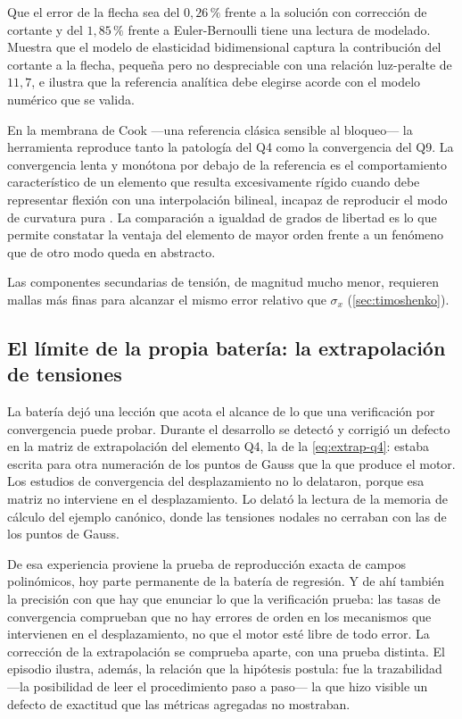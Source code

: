 Que el error de la flecha sea del $0{,}26\,\%$ frente a la solución con corrección de cortante y del $1{,}85\,\%$ frente a Euler-Bernoulli tiene una lectura de modelado. Muestra que el modelo de elasticidad bidimensional captura la contribución del cortante a la flecha, pequeña pero no despreciable con una relación luz-peralte de $11{,}7$, e ilustra que la referencia analítica debe elegirse acorde con el modelo numérico que se valida.

En la membrana de Cook —una referencia clásica sensible al bloqueo— la herramienta reproduce tanto la patología del Q4 como la convergencia del Q9. La convergencia lenta y monótona por debajo de la referencia es el comportamiento característico de un elemento que resulta excesivamente rígido cuando debe representar flexión con una interpolación bilineal, incapaz de reproducir el modo de curvatura pura \autocites[pp.~98-99]{cook2002concepts}[p.~476]{bathe2014fem}. La comparación a igualdad de grados de libertad es lo que permite constatar la ventaja del elemento de mayor orden frente a un fenómeno que de otro modo queda en abstracto.

Las componentes secundarias de tensión, de magnitud mucho menor, requieren mallas más finas para alcanzar el mismo error relativo que $\sigma_x$ (\autoref{sec:timoshenko}).

\subsection{El límite de la propia batería: la extrapolación de tensiones}
\label{sec:leccion-extrapolacion}

La batería dejó una lección que acota el alcance de lo que una verificación por convergencia puede probar. Durante el desarrollo se detectó y corrigió un defecto en la matriz de extrapolación del elemento Q4, la de la \autoref{eq:extrap-q4}: estaba escrita para otra numeración de los puntos de Gauss que la que produce el motor. Los estudios de convergencia del desplazamiento no lo delataron, porque esa matriz no interviene en el desplazamiento. Lo delató la lectura de la memoria de cálculo del ejemplo canónico, donde las tensiones nodales no cerraban con las de los puntos de Gauss.

De esa experiencia proviene la prueba de reproducción exacta de campos polinómicos, hoy parte permanente de la batería de regresión. Y de ahí también la precisión con que hay que enunciar lo que la verificación prueba: las tasas de convergencia comprueban que no hay errores de orden en los mecanismos que intervienen en el desplazamiento, no que el motor esté libre de todo error. La corrección de la extrapolación se comprueba aparte, con una prueba distinta. El episodio ilustra, además, la relación que la hipótesis postula: fue la trazabilidad —la posibilidad de leer el procedimiento paso a paso— la que hizo visible un defecto de exactitud que las métricas agregadas no mostraban.

